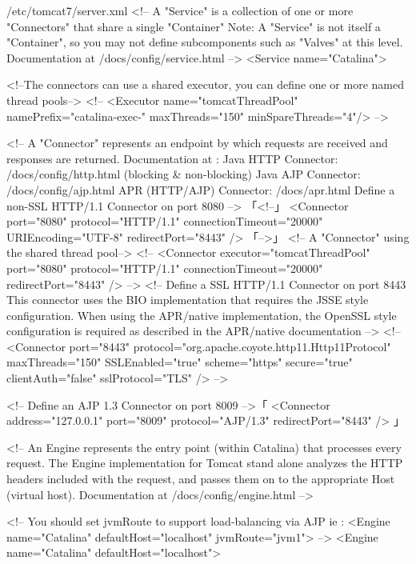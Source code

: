 \begin{lstdump}[basicstyle=\ttfamily\footnotesize]{/etc/tomcat7/server.xml}
  <!-- A "Service" is a collection of one or more "Connectors" that share
       a single "Container" Note:  A "Service" is not itself a "Container",
       so you may not define subcomponents such as "Valves" at this level.
       Documentation at /docs/config/service.html
   -->
  <Service name="Catalina">

    <!--The connectors can use a shared executor, you can define one or more named thread pools-->
    <!--
    <Executor name="tomcatThreadPool" namePrefix="catalina-exec-"
        maxThreads="150" minSpareThreads="4"/>
    -->

    <!-- A "Connector" represents an endpoint by which requests are received
         and responses are returned. Documentation at :
         Java HTTP Connector: /docs/config/http.html (blocking & non-blocking)
         Java AJP  Connector: /docs/config/ajp.html
         APR (HTTP/AJP) Connector: /docs/apr.html
         Define a non-SSL HTTP/1.1 Connector on port 8080
    -->
「<!--」
    <Connector port="8080" protocol="HTTP/1.1"
               connectionTimeout="20000"
               URIEncoding="UTF-8"
               redirectPort="8443" />
「-->」
    <!-- A "Connector" using the shared thread pool-->
    <!--
    <Connector executor="tomcatThreadPool"
               port="8080" protocol="HTTP/1.1"
               connectionTimeout="20000"
               redirectPort="8443" />
    -->
    <!-- Define a SSL HTTP/1.1 Connector on port 8443
         This connector uses the BIO implementation that requires the JSSE
         style configuration. When using the APR/native implementation, the
         OpenSSL style configuration is required as described in the APR/native
         documentation -->
    <!--
    <Connector port="8443" protocol="org.apache.coyote.http11.Http11Protocol"
               maxThreads="150" SSLEnabled="true" scheme="https" secure="true"
               clientAuth="false" sslProtocol="TLS" />
    -->

    <!-- Define an AJP 1.3 Connector on port 8009 -->「
    <Connector address="127.0.0.1" port="8009" protocol="AJP/1.3" redirectPort="8443" />
」

    <!-- An Engine represents the entry point (within Catalina) that processes
         every request.  The Engine implementation for Tomcat stand alone
         analyzes the HTTP headers included with the request, and passes them
         on to the appropriate Host (virtual host).
         Documentation at /docs/config/engine.html -->

    <!-- You should set jvmRoute to support load-balancing via AJP ie :
    <Engine name="Catalina" defaultHost="localhost" jvmRoute="jvm1">
    -->
    <Engine name="Catalina" defaultHost="localhost">


\end{lstdump}
